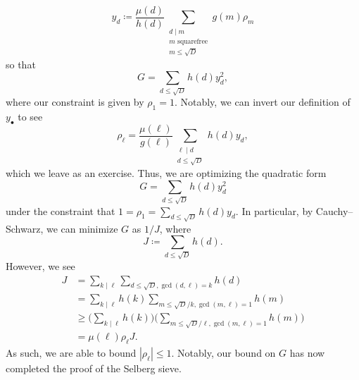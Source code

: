 \documentclass[../notes.tex]{subfiles}
\begin{document}
\[y_d\coloneqq\frac{\mu(d)}{h(d)}\sum_{\substack{d\mid m\\m\text{ squarefree}\\m\le\sqrt D}}g(m)\rho_m\]
so that
\[G=\sum_{d\le\sqrt D}h(d)y_d^2,\]
where our constraint is given by $\rho_1=1$. Notably, we can invert our definition of $y_\bullet$ to see
\[\rho_\ell=\frac{\mu(\ell)}{g(\ell)}\sum_{\substack{\ell\mid d\\d\le\sqrt D}}h(d)y_d,\]
which we leave as an exercise. Thus, we are optimizing the quadratic form
\[G=\sum_{d\le\sqrt D}h(d)y_d^2\]
under the constraint that $1=\rho_1=\sum_{d\le\sqrt D}h(d)y_d$. In particular, by Cauchy--Schwarz, we can minimize $G$ as $1/J$, where
\[J\coloneqq\sum_{d\le\sqrt D}h(d).\]
However, we see
\begin{align*}
	J &= \sum_{k\mid\ell}\sum_{d\le\sqrt D,\gcd(d,\ell)=k}h(d) \\
	&= \sum_{k\mid\ell}h(k)\sum_{m\le\sqrt D/k,\gcd(m,\ell)=1}h(m) \\
	&\ge \Bigg(\sum_{k\mid\ell}h(k)\Bigg)\Bigg(\sum_{m\le\sqrt D/\ell,\gcd(m,\ell)=1}h(m)\Bigg) \\
	&= \mu(\ell)\rho_\ell J.
\end{align*}
As such, we are able to bound $|\rho_\ell|\le1$. Notably, our bound on $G$ has now completed the proof of the Selberg sieve.
\end{document}
